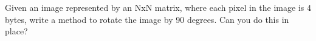  \label{sssec:ex1_06}

Given an image represented by an NxN matrix, where each pixel in the image is
4 bytes, write a method to rotate the image by 90 degrees. Can you do this in
place?



